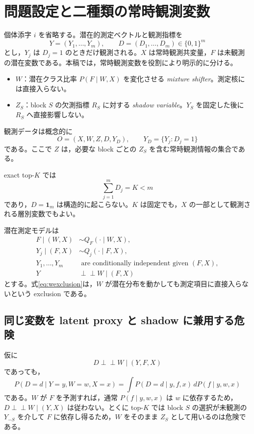 \documentclass[11pt,a4paper]{ltjsarticle}
\theoremstyle{remark}\newtheorem{remark}{注意}[section]
\newcommand{\ind}{\perp\!\!\!\perp}
\newcommand{\one}{\bm 1}
\begin{document}
\tableofcontents

\section{問題設定と二種類の常時観測変数}

個体添字 $i$ を省略する。潜在的測定ベクトルと観測指標を
\[
Y=(Y_1,\ldots,Y_m),\qquad D=(D_1,\ldots,D_m)\in\{0,1\}^m
\]
とし，$Y_j$ は $D_j=1$ のときだけ観測される。$X$ は常時観測共変量，$F$ は未観測の潜在変数である。本稿では，常時観測変数を役割により明示的に分ける。
\begin{itemize}
\item $W$：潜在クラス比率 $P(F\mid W,X)$ を変化させる \emph{mixture shifter}。測定核には直接入らない。
\item $Z_S$：block $S$ の欠測指標 $R_S$ に対する \emph{shadow variable}。$Y_S$ を固定した後に $R_S$ へ直接影響しない。
\end{itemize}
観測データは概念的に
\[
O=(X,W,Z,D,Y_D),\qquad Y_D=\{Y_j:D_j=1\}
\]
である。ここで $Z$ は，必要な block ごとの $Z_S$ を含む常時観測情報の集合である。

exact top-$K$ では
\[
\sum_{j=1}^mD_j=K<m
\]
であり，$D=\one_m$ は構造的に起こらない。$K$ は固定でも，$X$ の一部として観測される層別変数でもよい。

潜在測定モデルは
\begin{align}
F\mid(W,X)&\sim Q_F(\cdot\mid W,X),\label{eq:mixing}\\
Y_j\mid(F,X)&\sim Q_j(\cdot\mid F,X),\label{eq:measurement}\\
Y_1,\ldots,Y_m&\text{ are conditionally independent given }(F,X),\label{eq:localind}\\
Y&\ind W\mid(F,X)\label{eq:wexclusion}
\end{align}
とする。式\eqref{eq:wexclusion}は，$W$ が潜在分布を動かしても測定項目に直接入らないという exclusion である。

\subsection{同じ変数を latent proxy と shadow に兼用する危険}
仮に
\[
D\ind W\mid(Y,F,X)
\]
であっても，
\begin{equation}
P(D=d\mid Y=y,W=w,X=x)
=\int P(D=d\mid y,f,x)\,dP(f\mid y,w,x)\label{eq:integrateF}
\end{equation}
である。$W$ が $F$ を予測すれば，通常 $P(f\mid y,w,x)$ は $w$ に依存するため，
$D\ind W\mid(Y,X)$ は従わない。とくに top-$K$ では block $S$ の選択が未観測の $Y_{-S}$ を介して $F$ に依存し得るため，$W$ をそのまま $Z_S$ として用いるのは危険である。
\end{document}
